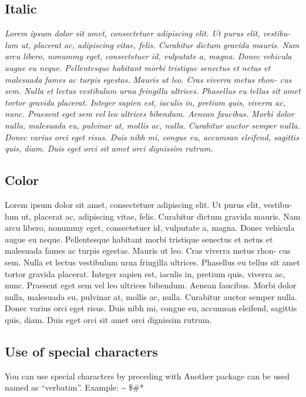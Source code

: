 \documentclass[12pt, a4paper]{article} %
\begin{document}
	
\subsection{Italic}
\textit{Lorem ipsum dolor sit amet, consectetuer adipiscing elit. Ut purus elit, vestibu-
	lum ut, placerat ac, adipiscing vitae, felis. Curabitur dictum gravida mauris.
	Nam arcu libero, nonummy eget, consectetuer id, vulputate a, magna. Donec
	vehicula augue eu neque. Pellentesque habitant morbi tristique senectus et netus
	et malesuada fames ac turpis egestas. Mauris ut leo. Cras viverra metus rhon-
	cus sem. Nulla et lectus vestibulum urna fringilla ultrices. Phasellus eu tellus
	sit amet tortor gravida placerat. Integer sapien est, iaculis in, pretium quis,
	viverra ac, nunc. Praesent eget sem vel leo ultrices bibendum. Aenean faucibus.
	Morbi dolor nulla, malesuada eu, pulvinar at, mollis ac, nulla. Curabitur auctor
	semper nulla. Donec varius orci eget risus. Duis nibh mi, congue eu, accumsan
	eleifend, sagittis quis, diam. Duis eget orci sit amet orci dignissim rutrum.
}

\subsection{Color}
{\color{red}Lorem ipsum dolor sit amet, consectetuer adipiscing elit. Ut purus elit, vestibu-
	lum ut, placerat ac, adipiscing vitae, felis. Curabitur dictum gravida mauris.
	Nam arcu libero, nonummy eget, consectetuer id, vulputate a, magna. Donec
	vehicula augue eu neque. Pellentesque habitant morbi tristique senectus et netus
	et malesuada fames ac turpis egestas. Mauris ut leo. Cras viverra metus rhon-
	cus sem. Nulla et lectus vestibulum urna fringilla ultrices. Phasellus eu tellus
	sit amet tortor gravida placerat. Integer sapien est, iaculis in, pretium quis,
	viverra ac, nunc. Praesent eget sem vel leo ultrices bibendum. Aenean faucibus.
	Morbi dolor nulla, malesuada eu, pulvinar at, mollis ac, nulla. Curabitur auctor
	semper nulla. Donec varius orci eget risus. Duis nibh mi, congue \pagebreak eu, accumsan
	eleifend, sagittis quis, diam. Duis eget orci sit amet orci dignissim rutrum.}
	

\subsection*{Use of special characters}	
You can use special characters by preceding with \. Another package can be
used named as “verbatim”. Example: \~ \! \$\#\@*
\end{document}
